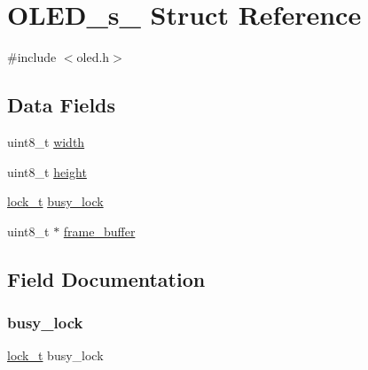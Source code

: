 \hypertarget{struct_o_l_e_d__s__}{}\section{O\+L\+E\+D\+\_\+s\+\_\+ Struct Reference}
\label{struct_o_l_e_d__s__}


{\ttfamily \#include $<$oled.\+h$>$}

\subsection*{Data Fields}
\begin{DoxyCompactItemize}
\item 
uint8\+\_\+t \mbox{\hyperlink{struct_o_l_e_d__s___a09a2a45f731b02946ff6d3cd15c1a476}{width}}
\item 
uint8\+\_\+t \mbox{\hyperlink{struct_o_l_e_d__s___adcf201a8aabf55cb352ec05331242594}{height}}
\item 
\mbox{\hyperlink{oled_8h_a1a4c08fa96a22e259cfe63b5093ab6ff}{lock\+\_\+t}} \mbox{\hyperlink{struct_o_l_e_d__s___a0659f7742a5ab72f3efa3a320eb2b6b7}{busy\+\_\+lock}}
\item 
uint8\+\_\+t $\ast$ \mbox{\hyperlink{struct_o_l_e_d__s___aca42f7778287b9a79affe540ce98d0f5}{frame\+\_\+buffer}}
\end{DoxyCompactItemize}


\subsection{Field Documentation}
\mbox{\label{struct_o_l_e_d__s___a0659f7742a5ab72f3efa3a320eb2b6b7}} 
\subsubsection{\texorpdfstring{busy\+\_\+lock}{busy\_lock}}
{\footnotesize\ttfamily \mbox{\hyperlink{oled_8h_a1a4c08fa96a22e259cfe63b5093ab6ff}{lock\+\_\+t}} busy\+\_\+lock}

\mbox{\label{struct_o_l_e_d__s___aca42f7778287b9a79affe540ce98d0f5}} 
